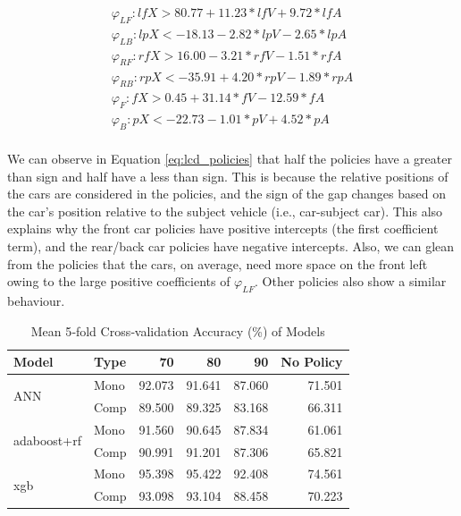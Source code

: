 \begin{equation}
\begin{aligned}
\varphi_{LF}: lfX > 80.77 + 11.23*lfV +9.72*lfA\\
\varphi_{LB}: lpX < -18.13 -2.82*lpV -2.65*lpA\\
\varphi_{RF}: rfX > 16.00 -3.21*rfV -1.51*rfA\\
\varphi_{RB}: rpX < -35.91 + 4.20*rpV -1.89*rpA\\
\varphi_{F}: fX > 0.45 + 31.14*fV -12.59*fA\\
\varphi_{B}: pX < -22.73 -1.01*pV + 4.52*pA\\
\end{aligned}
\label{eq:lcd_policies}
\end{equation}


We can observe in Equation \ref{eq:lcd_policies} that half the policies have a greater than sign and half have a less than sign. This is because the relative positions of the cars are considered in the policies, and the sign of the gap changes based on the car's position relative to the subject vehicle (i.e., car-subject car). This also explains why the front car policies have positive intercepts (the first coefficient term), and the rear/back car policies have negative intercepts. Also, we can glean from the policies that the cars, on average, need more space on the front left owing to the large positive coefficients of $\varphi_{LF}$. Other policies also show a similar behaviour.

\begin{table}[htbp]
   \centering
   \caption{Mean 5‑fold Cross‑validation Accuracy (\%) of Models}
   \label{tab:model_performance}
   \begin{tabular}{llrrrr}
   \toprule
   \textbf{Model} & \textbf{Type} & \textbf{70} & \textbf{80} & \textbf{90} & \textbf{No Policy} \\
   \midrule
   \multirow{2}{*}{ANN} 
     & Mono & 92.073 & 91.641 & 87.060 & 71.501 \\
     & Comp & 89.500 & 89.325 & 83.168 & 66.311 \\
   \midrule
   \multirow{2}{*}{\gls{adaboost}+\gls{rf}} 
     & Mono & 91.560 & 90.645 & 87.834 & 61.061 \\
     & Comp & 90.991 & 91.201 & 87.306 & 65.821 \\
   \midrule
   \multirow{2}{*}{\gls{xgb}} 
     & Mono & 95.398 & 95.422 & 92.408 & 74.561 \\
     & Comp & 93.098 & 93.104 & 88.458 & 70.223 \\
   \bottomrule
   \end{tabular}
   \end{table}
   


